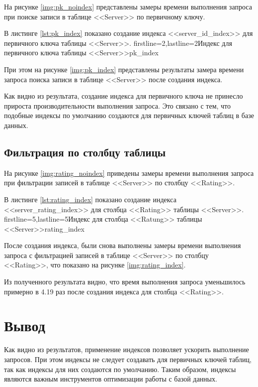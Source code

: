 На рисунке \ref{img:pk_noindex} представлены замеры времени выполнения запроса при поиске записи в таблице <<Server>> по первичному ключу.

В листинге \ref{lst:pk_index} показано создание индекса <<server\_id\_index>> для первичного ключа таблицы <<Server>>. 
            {firstline=2,lastline=2}{Индекс для первичного ключа таблицы <<Server>>}{pk_index}{}

При этом на рисунке \ref{img:pk_index} представлены результаты замера времени запроса поиска записи в таблице <<Server>> после создания индекса.

Как видно из результата, создание индекса для первичного ключа не принесло прироста производительности выполнения запроса. Это связано с тем, что подобные индексы по умолчанию создаются для первичных ключей таблиц в базе данных.


\subsection{Фильтрация по столбцу таблицы}

На рисунке \ref{img:rating_noindex} приведены замеры времени выполнения запроса при фильтрации записей в таблице <<Server>> по столбцу <<Rating>>.

В листинге \ref{lst:rating_index} показано создание индекса <<server\_rating\_index>> для столбца <<Rating>> таблицы <<Server>>. 
            {firstline=5,lastline=5}{Индекс для столбца <<Ratung>> таблицы <<Server>>}{rating_index}{}

После создания индекса, были снова выполнены замеры времени выполнения запроса с фильтрацией записей в таблице <<Server>> по столбцу <<Rating>>, что показано на рисунке \ref{img:rating_index}.

Из полученного результата видно, что время выполнения запроса уменьшилось примерно в 4.19 раз после создания индекса для столбца <<Rating>>.


\section*{Вывод}

Как видно из результатов, применение индексов позволяет ускорить выполнение запросов. При этом индексы не следует создавать для первичных ключей таблиц, так как индексы для них создаются по умолчанию. Таким образом, индексы являются важным инструментов оптимизации работы с базой данных.
